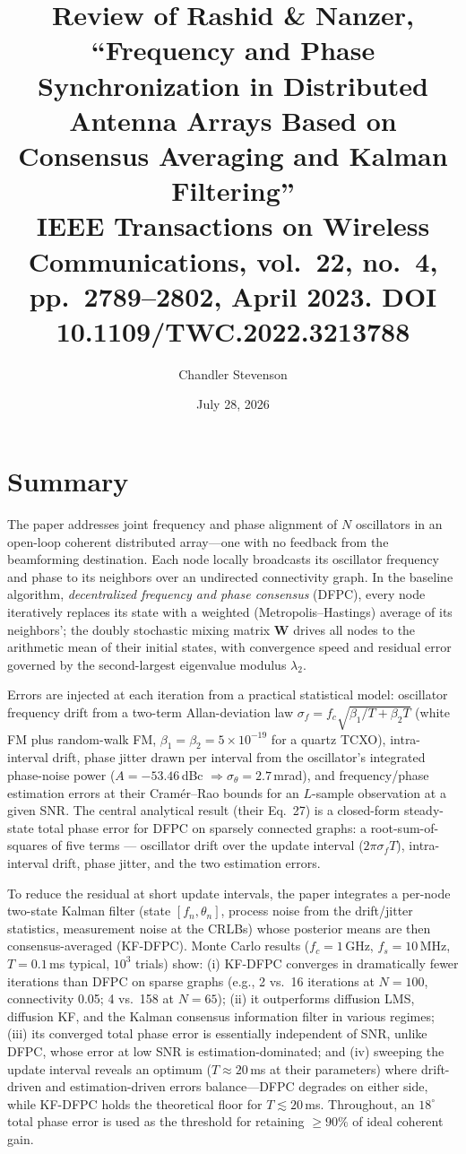 \documentclass[10pt]{article}
\title{Review of Rashid \& Nanzer, ``Frequency and Phase Synchronization in
Distributed Antenna Arrays Based on Consensus Averaging and Kalman
Filtering''\\[2pt]
\large IEEE Transactions on Wireless Communications, vol.~22, no.~4,
pp.~2789--2802, April 2023. DOI 10.1109/TWC.2022.3213788}
\author{Chandler Stevenson}
\date{July 28, 2026}
\begin{document}
\maketitle

\section{Summary}
The paper addresses joint frequency and phase alignment of $N$ oscillators
in an open-loop coherent distributed array---one with no feedback from the
beamforming destination. Each node locally broadcasts its oscillator
frequency and phase to its neighbors over an undirected connectivity graph.
In the baseline algorithm, \emph{decentralized frequency and phase consensus}
(DFPC), every node iteratively replaces its state with a weighted
(Metropolis--Hastings) average of its neighbors'; the doubly stochastic
mixing matrix $\mathbf{W}$ drives all nodes to the arithmetic mean of their
initial states, with convergence speed and residual error governed by the
second-largest eigenvalue modulus $\lambda_2$.

Errors are injected at each iteration from a practical statistical model:
oscillator frequency drift from a two-term Allan-deviation law
$\sigma_f = f_c\sqrt{\beta_1/T + \beta_2 T}$ (white FM plus random-walk FM,
$\beta_1{=}\beta_2{=}5\times10^{-19}$ for a quartz TCXO), intra-interval
drift, phase jitter drawn per interval from the oscillator's integrated
phase-noise power ($A = -53.46$\,dBc $\Rightarrow \sigma_\theta =
2.7$\,mrad), and frequency/phase estimation errors at their Cram\'er--Rao
bounds for an $L$-sample observation at a given SNR. The central analytical
result (their Eq.~27) is a closed-form steady-state total phase error for
DFPC on sparsely connected graphs: a root-sum-of-squares of five terms ---
oscillator drift over the update interval ($2\pi\sigma_f T$), intra-interval
drift, phase jitter, and the two estimation errors.

To reduce the residual at short update intervals, the paper integrates a
per-node two-state Kalman filter (state $[f_n,\theta_n]$, process noise from
the drift/jitter statistics, measurement noise at the CRLBs) whose posterior
means are then consensus-averaged (KF-DFPC). Monte Carlo results
($f_c = 1$\,GHz, $f_s = 10$\,MHz, $T = 0.1$\,ms typical, $10^3$ trials)
show: (i) KF-DFPC converges in dramatically fewer iterations than DFPC on
sparse graphs (e.g., 2 vs.~16 iterations at $N{=}100$, connectivity 0.05;
4 vs.~158 at $N{=}65$); (ii) it outperforms diffusion LMS, diffusion KF, and
the Kalman consensus information filter in various regimes; (iii) its
converged total phase error is essentially independent of SNR, unlike DFPC,
whose error at low SNR is estimation-dominated; and (iv) sweeping the update
interval reveals an optimum ($T \approx 20$\,ms at their parameters) where
drift-driven and estimation-driven errors balance---DFPC degrades on either
side, while KF-DFPC holds the theoretical floor for $T \lesssim 20$\,ms.
Throughout, an $18^\circ$ total phase error is used as the threshold for
retaining ${\geq}90\%$ of ideal coherent gain.
\end{document}
